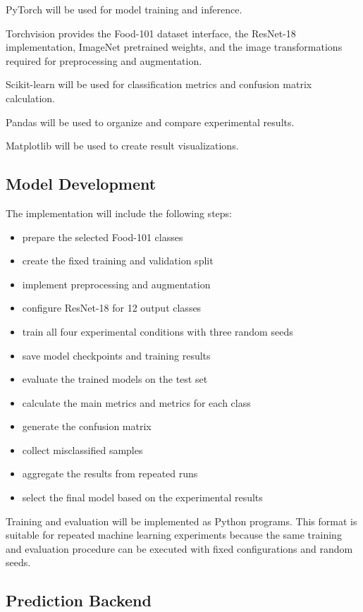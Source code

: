 \documentclass[11pt,a4paper]{article}
\begin{document}
PyTorch will be used for model training and inference.

Torchvision provides the Food-101 dataset interface, the ResNet-18 implementation,
ImageNet pretrained weights, and the image transformations required for preprocessing
and augmentation.

Scikit-learn will be used for classification metrics and confusion matrix calculation.

Pandas will be used to organize and compare experimental results.

Matplotlib will be used to create result visualizations.

\subsection{Model Development}

The implementation will include the following steps:

\begin{itemize}
    \item prepare the selected Food-101 classes
    \item create the fixed training and validation split
    \item implement preprocessing and augmentation
    \item configure ResNet-18 for 12 output classes
    \item train all four experimental conditions with three random seeds
    \item save model checkpoints and training results
    \item evaluate the trained models on the test set
    \item calculate the main metrics and metrics for each class
    \item generate the confusion matrix
    \item collect misclassified samples
    \item aggregate the results from repeated runs
    \item select the final model based on the experimental results
\end{itemize}

Training and evaluation will be implemented as Python programs. This format is suitable
for repeated machine learning experiments because the same training and evaluation
procedure can be executed with fixed configurations and random seeds.

\subsection{Prediction Backend}
\end{document}
